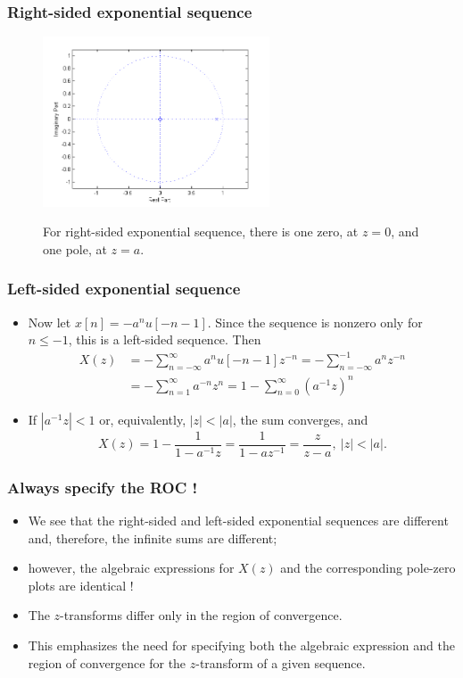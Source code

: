 \begin{frame}
\frametitle{Right-sided exponential sequence}
\begin{figure}
  \centering
  \includegraphics[width=0.6\textwidth]{polezeroonesided.png}\\
  \caption{For right-sided exponential sequence, there is one zero, at $z=0$, and one pole, at $z=a$.}
\end{figure}
\end{frame}

\begin{frame}
\frametitle{Left-sided exponential sequence}
\begin{itemize}
\item Now let $x[n]=-a^{n}u[-n-1]$. Since the sequence is nonzero only for $n\leq-1$, this is a \alert{left-sided} sequence.
Then
\begin{align*}
X(z)&=-\sum_{n=-\infty}^{\infty}a^{n}u[-n-1]z^{-n}=-\sum_{n=-\infty}^{-1}a^{n}z^{-n} \\
&=-\sum_{n=1}^{\infty}a^{-n}z^{n}=1-\sum_{n=0}^{\infty}(a^{-1}z)^{n}
\end{align*}
\item If $|a^{-1}z|<1$ or, equivalently, $|z|<|a|$, the sum  converges, and
$$
X(z)=1-\frac{1}{1-a^{-1}z}=\frac{1}{1-az^{-1}}=\frac{z}{z-a},\ |z|<|a|.
$$
\end{itemize}
\end{frame}

\begin{frame}
\frametitle{Always specify the ROC !}
\begin{itemize}
\item We see that the right-sided and left-sided exponential sequences are different and, therefore, the infinite sums are different;
\item however, the algebraic expressions for $X(z)$ and the corresponding pole-zero plots are identical !
\item The $z$-transforms differ only in the \alert{region of convergence}.
\item This emphasizes the need for specifying \alert{both} the \alert{algebraic expression} and \alert{the region of convergence} for the $z$-transform of a given sequence.
\end{itemize}
\end{frame}


